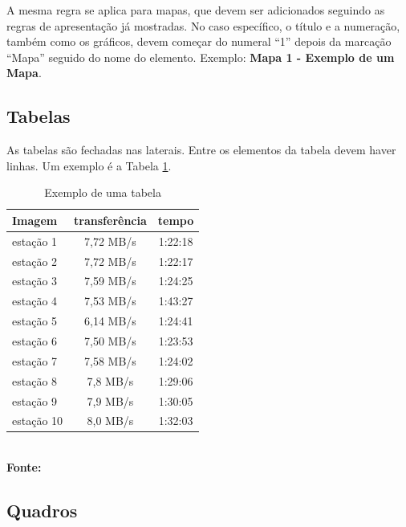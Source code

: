 A mesma regra se aplica para mapas, que devem ser adicionados seguindo as regras de apresentação já mostradas. No caso específico,
o título e a numeração, também como os gráficos, devem começar do numeral ``1'' depois da marcação ``Mapa'' seguido do nome do elemento.
Exemplo: \textbf{Mapa 1 - Exemplo de um Mapa}.

 \subsection{\esp Tabelas}

As tabelas são fechadas nas laterais. Entre os elementos da tabela devem haver linhas. Um exemplo é a Tabela \ref{tab:tabela1}. 

\begin{table}[htb]
	\centering
	\caption{\hspace{0.1cm} Exemplo de uma tabela}
	\vspace{-0.3cm} %
	\label{tab:tabela1}
	\begin{tabular}{l|c|c}
  \hline
    \textbf{Imagem}	& \textbf{transferência} & \textbf{tempo} \\
    \hline
     estação 1	& 7,72 MB/s &  1:22:18 \\
     estação 2	& 7,72 MB/s &  1:22:17 \\
     estação 3	& 7,59 MB/s & 1:24:25 \\
     estação 4  & 7,53 MB/s & 1:43:27 \\
     estação 5	& 6,14 MB/s  &  1:24:41 \\
     estação 6  &  7,50 MB/s & 1:23:53 \\
     estação 7  & 7,58 MB/s  &  1:24:02 \\
     estação 8  & 7,8 MB/s  &  1:29:06 \\
     estação 9  & 7,9 MB/s  &  1:30:05 \\
     estação 10 & 8,0 MB/s  &  1:32:03 \\
     \hline
 \end{tabular}
 	\vspace{.1cm}  %
	\small
	{\footnotesize\\ \textbf{Fonte: \cite{monog-fabio}}}
\end{table}

\subsection{\esp Quadros}

